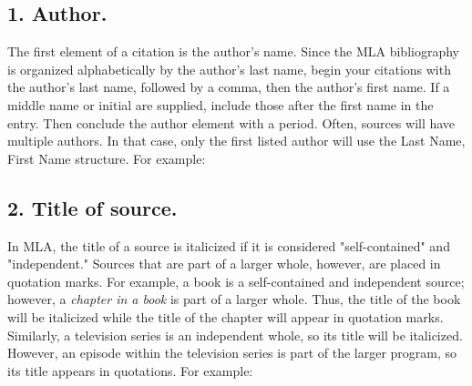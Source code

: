 \subsection{1. Author.}

The first element of a citation is the author's name. Since the MLA bibliography is organized alphabetically by the author's last name, begin your citations with the author's last name, followed by a comma, then the author's first name. If a middle name or initial are supplied, include those after the first name in the entry. Then conclude the author element with a period. Often, sources will  have multiple authors. In that case, only the first listed author will use the Last Name, First Name structure. For example: \bigskip


\smallskip
 


\subsection{2. Title of source.}

In MLA, the title of a source is italicized if it is considered "self-contained" and "independent." Sources that are part of a larger whole, however, are placed in quotation marks. For example, a book is a self-contained and independent source; however, a \emph{chapter in a book} is part of a larger whole. Thus, the title of the book will be italicized while the title of the chapter will appear in quotation marks. Similarly, a television series is an independent whole, so its title will be italicized. However, an episode within the television series is part of the larger program, so its title appears in quotations. For example: \bigskip 


\smallskip



